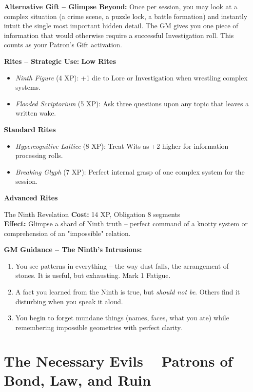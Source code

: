\documentclass[10pt,a5paper]{book}
\begin{document}
\textbf{Alternative Gift -- Glimpse Beyond:} Once per session, you may look at a complex situation (a crime scene, a puzzle lock, a battle formation) and instantly intuit the single most important hidden detail. The GM gives you one piece of information that would otherwise require a successful Investigation roll. This counts as your Patron's Gift activation.

\textbf{Rites -- Strategic Use:}
\textbf{Low Rites}
\begin{itemize}
    \item \textit{Ninth Figure} (4 XP): +1 die to Lore or Investigation when wrestling complex systems.
    \item \textit{Flooded Scriptorium} (5 XP): Ask three questions upon any topic that leaves a written wake.
\end{itemize}
\textbf{Standard Rites}
\begin{itemize}
    \item \textit{Hypercognitive Lattice} (8 XP): Treat Wits as +2 higher for information-processing rolls.
    \item \textit{Breaking Glyph} (7 XP): Perfect internal grasp of one complex system for the session.
\end{itemize}
\textbf{Advanced Rites}
\begin{patronbox}{The Ninth Revelation}
\textbf{Cost:} 14 XP, Obligation 8 segments \\
\textbf{Effect:} Glimpse a shard of Ninth truth -- perfect command of a knotty system or comprehension of an "impossible" relation.
\end{patronbox}

\textbf{GM Guidance -- The Ninth's Intrusions:}
\begin{enumerate}
    \item You see patterns in everything -- the way dust falls, the arrangement of stones. It is useful, but exhausting. Mark 1 Fatigue.
    \item A fact you learned from the Ninth is true, but \textit{should not be}. Others find it disturbing when you speak it aloud.
    \item You begin to forget mundane things (names, faces, what you ate) while remembering impossible geometries with perfect clarity.
\end{enumerate}

\section{The Necessary Evils -- Patrons of Bond, Law, and Ruin}
\end{document}
